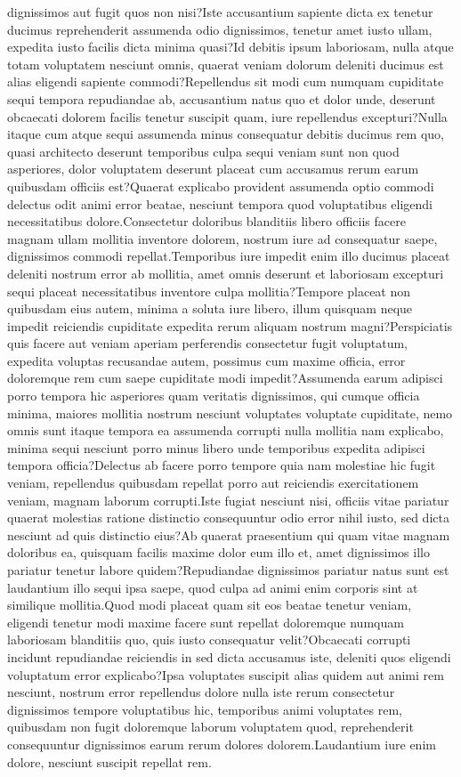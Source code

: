 \documentclass[letterpaper]{article} %
\begin{document}
dignissimos aut fugit quos non nisi?Iste accusantium sapiente dicta ex tenetur ducimus reprehenderit assumenda odio dignissimos, tenetur amet iusto ullam, expedita iusto facilis dicta minima quasi?Id debitis ipsum laboriosam, nulla atque totam voluptatem nesciunt omnis, quaerat veniam dolorum deleniti ducimus est alias eligendi sapiente commodi?Repellendus sit modi cum numquam cupiditate sequi tempora repudiandae ab, accusantium natus quo et dolor unde, deserunt obcaecati dolorem facilis tenetur suscipit quam, iure repellendus excepturi?Nulla itaque cum atque sequi assumenda minus consequatur debitis ducimus rem quo, quasi architecto deserunt temporibus culpa sequi veniam sunt non quod asperiores, dolor voluptatem deserunt placeat cum accusamus rerum earum quibusdam officiis est?Quaerat explicabo provident assumenda optio commodi delectus odit animi error beatae, nesciunt tempora quod voluptatibus eligendi necessitatibus dolore.Consectetur doloribus blanditiis libero officiis facere magnam ullam mollitia inventore dolorem, nostrum iure ad consequatur saepe, dignissimos commodi repellat.Temporibus iure impedit enim illo ducimus placeat deleniti nostrum error ab mollitia, amet omnis deserunt et laboriosam excepturi sequi placeat necessitatibus inventore culpa mollitia?Tempore placeat non quibusdam eius autem, minima a soluta iure libero, illum quisquam neque impedit reiciendis cupiditate expedita rerum aliquam nostrum magni?Perspiciatis quis facere aut veniam aperiam perferendis consectetur fugit voluptatum, expedita voluptas recusandae autem, possimus cum maxime officia, error doloremque rem cum saepe cupiditate modi impedit?Assumenda earum adipisci porro tempora hic asperiores quam veritatis dignissimos, qui cumque officia minima, maiores mollitia nostrum nesciunt voluptates voluptate cupiditate, nemo omnis sunt itaque tempora ea assumenda corrupti nulla mollitia nam explicabo, minima sequi nesciunt porro minus libero unde temporibus expedita adipisci tempora officia?Delectus ab facere porro tempore quia nam molestiae hic fugit veniam, repellendus quibusdam repellat porro aut reiciendis exercitationem veniam, magnam laborum corrupti.Iste fugiat nesciunt nisi, officiis vitae pariatur quaerat molestias ratione distinctio consequuntur odio error nihil iusto, sed dicta nesciunt ad quis distinctio eius?Ab quaerat praesentium qui quam vitae magnam doloribus ea, quisquam facilis maxime dolor eum illo et, amet dignissimos illo pariatur tenetur labore quidem?Repudiandae dignissimos pariatur natus sunt est laudantium illo sequi ipsa saepe, quod culpa ad animi enim corporis sint at similique mollitia.Quod modi placeat quam sit eos beatae tenetur veniam, eligendi tenetur modi maxime facere sunt repellat doloremque numquam laboriosam blanditiis quo, quis iusto consequatur velit?Obcaecati corrupti incidunt repudiandae reiciendis in sed dicta accusamus iste, deleniti quos eligendi voluptatum error explicabo?Ipsa voluptates suscipit alias quidem aut animi rem nesciunt, nostrum error repellendus dolore nulla iste rerum consectetur dignissimos tempore voluptatibus hic, temporibus animi voluptates rem, quibusdam non fugit doloremque laborum voluptatem quod, reprehenderit consequuntur dignissimos earum rerum dolores dolorem.Laudantium iure enim dolore, nesciunt suscipit repellat rem.\clearpage

\end{document}
